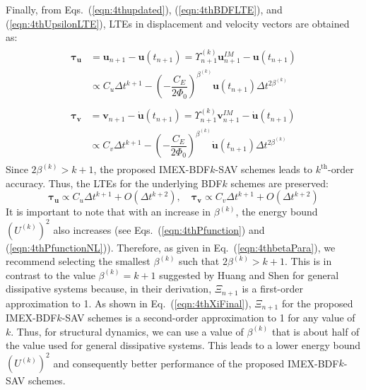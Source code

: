 \documentclass[review]{elsarticle}
\begin{document}
Finally, from Eqs.~(\ref{eqn:4thupdated}), (\ref{eqn:4thBDFLTE}), and (\ref{eqn:4thUpsilonLTE}), LTEs in displacement and velocity vectors are obtained as:
\begin{align} 
    \begin{array}{ll}
        \boldsymbol{\tau}_{\boldsymbol{u}} & = \boldsymbol{u}_{n+1}-\boldsymbol{u}(t_{n+1}) = \Upsilon^{(k)}_{n+1}\boldsymbol{u}^{IM}_{n+1}-\boldsymbol{u}(t_{n+1}) \\
        & \propto  C_u \Delta t^{k+1} - \left(- \dfrac{C_E}{2\Phi_0}\right)^{\beta^{(k)}}  \boldsymbol{u}(t_{n+1}) \Delta t^{2\beta^{(k)}}
    \end{array}    \\
    \begin{array}{ll}
       \boldsymbol{\tau}_{\boldsymbol{v}} & = \boldsymbol{v}_{n+1}-\dot{\boldsymbol{u}}(t_{n+1}) = \Upsilon^{(k)}_{n+1}\boldsymbol{v}^{IM}_{n+1}-\dot{\boldsymbol{u}}(t_{n+1}) \\
       & \propto  C_v \Delta t^{k+1} - \left(- \dfrac{C_E}{2\Phi_0}\right)^{\beta^{(k)}} \dot{\boldsymbol{u}}(t_{n+1}) \Delta t^{2\beta^{(k)}}
   \end{array}
\end{align}
Since $2\beta^{(k)} > k+1$, the proposed IMEX-BDF$k$-SAV schemes leads to $k^{\textrm{th}}$-order accuracy.
Thus, the LTEs for the underlying BDF$k$ schemes are preserved:
\begin{equation}
    \boldsymbol{\tau}_{\boldsymbol{u}} \propto  C_{u} \Delta t^{k+1} + O(\Delta t^{k+2}), \quad
    \boldsymbol{\tau}_{\boldsymbol{v}} \propto C_{v} \Delta t^{k+1} + O(\Delta t^{k+2})
\end{equation}
It is important to note that with an increase in $\beta^{(k)}$, the energy bound $\left(U^{(k)}\right)^2$ also increases (see Eqs.~(\ref{eqn:4thPfunction}) and (\ref{eqn:4thPfunctionNL})).
Therefore, as given in Eq.~(\ref{eqn:4thbetaPara}), we recommend selecting the smallest $\beta^{(k)}$ such that $2\beta^{(k)} > k+1$.
This is in contrast to the value $\beta^{(k)} = k+1$ suggested by Huang and Shen \cite{huang2022new} for general dissipative systems because, in their derivation, $\Xi_{n+1}$ is a first-order approximation to 1. 
As shown in Eq.~(\ref{eqn:4thXiFinal}), $\Xi_{n+1}$ for the proposed IMEX-BDF$k$-SAV schemes is a second-order approximation to 1 for any value of $k$.
Thus, for structural dynamics, we can use a value of $\beta^{(k)}$ that is about half of the value used for general dissipative systems.
This leads to a lower energy bound $\left( U^{(k)} \right)^2$ and consequently better performance of the proposed IMEX-BDF$k$-SAV schemes.
\end{document}
